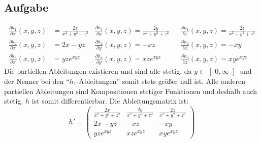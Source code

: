 \documentclass[10pt,a4paper,parskip=half]{scrartcl}
\begin{document}
\begin{enumerate}[(i)]
\section{Aufgabe}
\begin{align*}
\frac{\partial h_1}{\partial x}(x,y,z) &= \frac {2x}{x^2+y^2+z^2} &\frac{\partial h_1}{\partial y}(x,y,z) = \frac{2y}{x^2+y^2+z^2} &&\frac{\partial h_1}{\partial z}(x,y,z) = \frac{2z}{x^2+y^2+z^2}\\
\frac{\partial h_2}{\partial x}(x,y,z) &= 2x-yz &\frac{\partial h_2}{\partial y}(x,y,z) = -xz &&\frac{\partial h_2}{\partial z}(x,y,z) = -xy\\
\frac{\partial h_3}{\partial x}(x,y,z) &= yze^{xyz} &\frac{\partial h_3}{\partial y}(x,y,z) = xze^{xyz} &&\frac{\partial h_3}{\partial z}(x,y,z) = xye^{xyz}
\end{align*}
Die partiellen Ableitungen existieren und sind alle stetig, da $y \in \left]0,\infty\right[$ und der Nenner bei den ``$h_1$-Ableitungen'' somit stets größer null ist. Alle anderen partiellen Ableitungen sind Kompositionen stetiger Funktionen und deshalb auch stetig. $h$ ist somit differentierbar.
Die Ableitungsmatrix ist:
$$h' =\begin{pmatrix}
\frac{2x}{x^2 + y^2 + z^2} & \frac{2y}{x^2 + y^2 + z^2} & \frac{2z}{x^2 + y^2 + z^2} \\
2x - yz & -xz & -xy \\
yze^{xyz}  & xze^{xyz} & xye^{xyz} 
\end{pmatrix}  $$


\end{enumerate}
\end{document}
